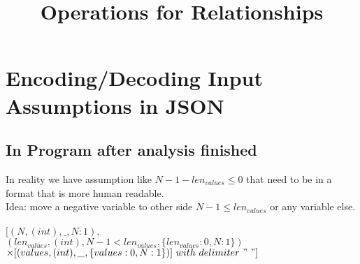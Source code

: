 \documentclass[11pt]{article}
\begin{document}
\title{Operations for Relationships}

\maketitle


\section{Encoding/Decoding Input Assumptions in JSON}


\subsection{In Program after analysis finished}

In reality we have assumption like $N - 1 - len_{values} \leq 0$ that need to be in a format that is more human readable.\\
Idea: move a negative variable to other side $N - 1 \leq len_{values}$ or any variable else.\\
\\
$[(N, (int), \_, {N: 1}),$\\
$(len_{values}, (int), N-1 < len_{values}, \{len_{values}: 0, N: 1\})$\\
$\times [(values, (int), \_, \{values: 0, N: 1\})]\ with\ delimiter\ "\ "]$\\
\end{document}
